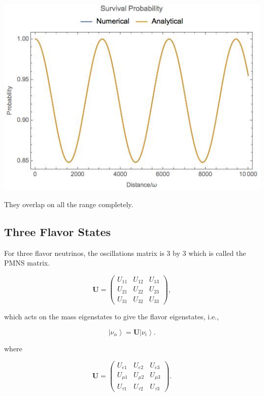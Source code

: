 \documentclass{tufte-handout}
\newcommand{\ket}[1]{\left| #1\right\rangle}
\begin{document}
\begin{marginfigure}
\includegraphics{assets/vacuumOsc}
\caption{They overlap on all the range completely.}
\end{marginfigure}




\subsection{Three Flavor States}

For three flavor neutrinos, the oscillations matrix is 3 by 3 which is called the PMNS matrix.

\begin{equation*}
\mathbf U = \begin{pmatrix}
U_{11} & U_{12} & U_{13} \\
U_{21} & U_{22} & U_{23} \\
U_{31} & U_{32} & U_{33}
\end{pmatrix},
\end{equation*}

which acts on the mass eigenstates to give the flavor eigenstates, i.e.,

\begin{equation*}
\ket{\nu_\alpha}= \mathbf{U}\ket{\nu_i}.
\end{equation*}

where

\begin{equation*}
\mathbf{U} = \begin{pmatrix}
U_{e1} & U_{e2} & U_{e3} \\
U_{\mu 1} & U_{\mu 2} & U_{\mu 3}\\
U_{\tau 1} & U_{\tau 2} & U_{\tau 3}
\end{pmatrix}.
\end{equation*}
\end{document}
